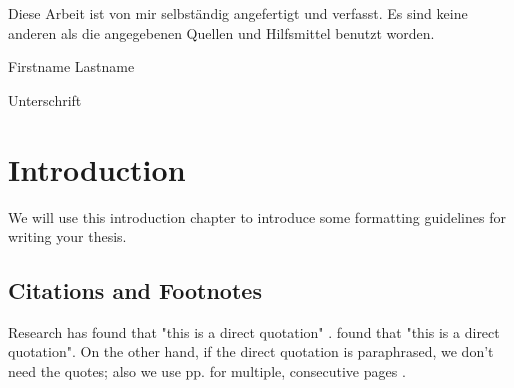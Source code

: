 
%



	
\restoregeometry


\clearpage
\vspace*{\fill}
\begin{center}
	\begin{minipage}{.8\textwidth}
		\thispagestyle{empty} %
		Diese Arbeit ist von mir selbst\"andig angefertigt und verfasst. Es sind keine anderen als die angegebenen Quellen und Hilfsmittel benutzt worden.\par
		\vspace{1cm}
		Firstname Lastname \dotfill \par
		Unterschrift
	\end{minipage}
\end{center}
\vfill %
\clearpage


\begin{abstract}
	\thispagestyle{plain}
	\setcounter{page}{1}
	\lipsum[1-3]
\end{abstract}

\tableofcontents
\setcounter{page}{2}
\listoffigures
{\let\clearpage\relax \listoftables}

\printnoidxglossary[type=\acronymtype,title={List of Acronyms}]

{\let\clearpage\relax \printnoidxglossary[type=symbols,sort=letter]}

\chapter{Introduction}
We will use this introduction chapter to introduce some formatting guidelines for writing your thesis.

\section{Citations and Footnotes}
Research has found that "this is a direct quotation" \autocite[p. 1]{Doe:1}. \textcite[p. 1]{Doe:1} found that "this is a direct quotation". On the other hand, if the direct quotation is paraphrased, we don't need the quotes; also we use pp. for multiple, consecutive pages \autocite[pp. 35-37]{Doe:2}.\par


